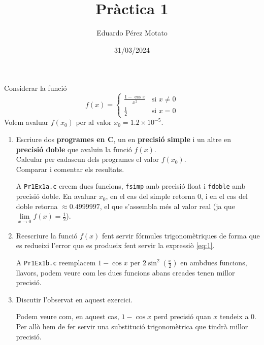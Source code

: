 \documentclass[a4paper, 12pt]{article}
\title{Pràctica 1}
\author{Eduardo Pérez Motato}
\date{31/03/2024}
\begin{document}
    \makeheader

    \begin{exercici}
        Considerar la funció
        \begin{equation}
            f\left(x\right) = 
            \begin{cases}
                \frac{1-\cos{x}}{x^2} & \text{si } x \neq 0\\
                \frac{1}{2} & \text{si } x = 0
            \end{cases}
            \label{eq:1}
        \end{equation}
        Volem avaluar $f(x_0)$ per al valor $x_0 = 1.2 \times 10^{-5}$.
        \begin{enumerate}[label=\alph*)]
            \item Escriure dos \textbf{programes en C}, un en \textbf{precisió simple} i un altre en
            \textbf{precisió doble} que avaluïn la funció $f\left(x\right)$.\\
            Calcular per cadascun dels programes el valor $f\left(x_0\right)$.\\
            Comparar i comentar els resultats.\\
            \begin{solucio}
                A \verb|Pr1Ex1a.c| creem dues funcions, \verb|fsimp| amb precisió float i \verb|fdoble|
                amb precisió doble. En avaluar $x_0$, en el cas del simple retorna $0$, i en el cas
                del doble retorna $\approx 0.4999997$, el que s'assembla més al valor real (ja que
                $\lim\limits_{x \to 0} f\left(x\right) = \frac{1}{2}$).
            \end{solucio}
            \item Reescriure la funció $f\left(x\right)$ fent servir fórmules trigonomètriques de
            forma que es redueixi l'error que es produeix fent servir la expressiò \eqref{eq:1}.\\
            \begin{solucio}
                A \verb|Pr1Ex1b.c| reemplacem $1-\cos{x}$ per $2\sin^2{\left(\frac{x}{2}\right)}$ en
                ambdues funcions, llavors, podem veure com les dues funcions abans creades tenen
                millor precisió.
            \end{solucio}
            \item Discutir l'observat en aquest exercici.\\
            \begin{solucio}
                Podem veure com, en aquest cas, $1-\cos{x}$ perd precisió quan $x$ tendeix a $0$.
                Per allò hem de fer servir una substitució trigonomètrica que tindrà millor precisió.
            \end{solucio}
        \end{enumerate}
    \end{exercici}
    \newpage
\end{document}

